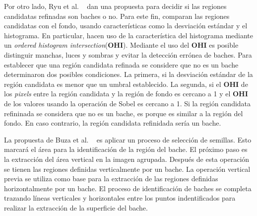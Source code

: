 		

		Por otro lado, Ryu et al. ~ dan una propuesta para decidir si las regiones candidatas refinadas son baches o no. Para este fin, 
		comparan las regiones candidatas con el fondo, usando características como la desviación estándar y el histograma. En particular, hacen 
		uso de la característica del histograma mediante un \emph{ordered histogram intersection}(\textbf{OHI}). Mediante el uso del \textbf{OHI} es posible 
		distinguir manchas, luces y sombras y evitar la detección errónea de baches. Para establecer que una región candidata refinada se considere que no es un 
		bache determinaron dos posibles condiciones. La primera, si la desviación estándar de la región candidata es menor que un umbral establecido. La segunda, 
		si el \textbf{OHI} de los \emph{pixels} entre la región candidata y la región de fondo   es cercano a 1 y el \textbf{OHI} de los valores usando la operación 
		de Sobel es cercano a 1. Si la región candidata refininada se considera que no es un bache, es porque es similar a la región del fondo. En caso contrario, 
		la región candidata refinidada sería un bache.
		
		
		La propuesta de Buza et al. ~ es aplicar un proceso de selección de semillas. Esto marcará el área para la identificación 
		de la región del bache. El próximo paso es la extracción del área vertical en la imagen agrupada. Después de esta operación se tienen las regiones 
		definidas verticalmente por un bache. La operación vertical previa se utiliza como base para la extracción de las regiones definidas horizontalmente 
		por un bache. El proceso de identificación de baches se completa trazando líneas verticales y horizontales entre los puntos indentificados para 
		realizar la extracción de la superficie del bache.
